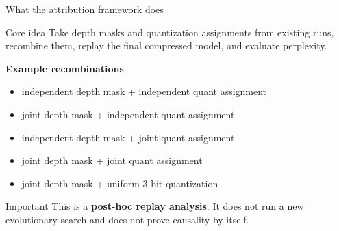 \documentclass[aspectratio=169]{beamer}
\begin{document}
\begin{frame}{What the attribution framework does}
\begin{block}{Core idea}
Take depth masks and quantization assignments from existing runs, recombine them, replay the final compressed model, and evaluate perplexity.
\end{block}

\vspace{0.2cm}
\textbf{Example recombinations}
\begin{itemize}
    \item independent depth mask + independent quant assignment
    \item joint depth mask + independent quant assignment
    \item independent depth mask + joint quant assignment
    \item joint depth mask + joint quant assignment
    \item joint depth mask + uniform 3-bit quantization
\end{itemize}

\vspace{0.2cm}
\begin{block}{Important}
This is a \textbf{post-hoc replay analysis}. It does not run a new evolutionary search and does not prove causality by itself.
\end{block}
\end{frame}

\end{document}
